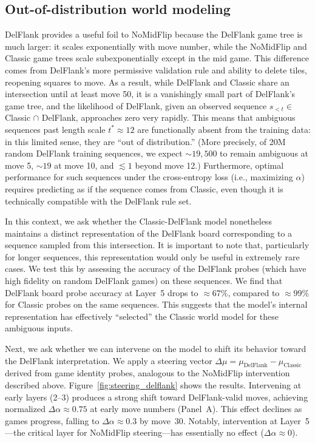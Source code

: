 \documentclass{article}
\theoremstyle{plain}
\theoremstyle{definition}
\theoremstyle{remark}
\begin{document}
\subsection{Out-of-distribution world modeling}

DelFlank provides a useful foil to NoMidFlip because the DelFlank game tree is much larger: it scales exponentially with move number, while the NoMidFlip and Classic game trees scale subexponentially except in the mid game. This difference comes from DelFlank's more permissive validation rule and ability to delete tiles, reopening squares to move. As a result, while DelFlank and Classic share an intersection until at least move 50, it is a vanishingly small part of DelFlank's game tree, and the likelihood of DelFlank, given an observed sequence $s_{<t} \in$ Classic $\cap$ DelFlank, approaches zero very rapidly. This means that ambiguous sequences past length scale $t^* \approx 12$ are functionally absent from the training data: in this limited sense, they are ``out of distribution.'' (More precisely, of 20M random DelFlank training sequences, we expect $\sim 19,500$ to remain ambiguous at move 5, $\sim 19$ at move 10, and $\lesssim 1$ beyond move 12.) Furthermore, optimal performance for such sequences under the cross-entropy loss (i.e., maximizing $\alpha$) requires predicting as if the sequence comes from Classic, even though it is technically compatible with the DelFlank rule set.

In this context, we ask whether the Classic-DelFlank model nonetheless maintains a distinct representation of the DelFlank board corresponding to a sequence sampled from this intersection. It is important to note that, particularly for longer sequences, this representation would only be useful in extremely rare cases. We test this by assessing the accuracy of the DelFlank probes (which have high fidelity on random DelFlank games) on these sequences. We find that DelFlank board probe accuracy at Layer~5 drops to $\approx67\%$, compared to $\approx99\%$ for Classic probes on the same sequences. This suggests that the model's internal representation has effectively ``selected'' the Classic world model for these ambiguous inputs.

Next, we ask whether we can intervene on the model to shift its behavior toward the DelFlank interpretation. We apply a steering vector $\Delta\mu = \mu_{\text{DelFlank}} - \mu_{\text{Classic}}$ derived from game identity probes, analogous to the NoMidFlip intervention described above. Figure~\ref{fig:steering_delflank} shows the results. Intervening at early layers (2--3) produces a strong shift toward DelFlank-valid moves, achieving normalized $\Delta\alpha \approx 0.75$ at early move numbers (Panel~A). This effect declines as games progress, falling to $\Delta\alpha \approx 0.3$ by move~30. Notably, intervention at Layer~5---the critical layer for NoMidFlip steering---has essentially no effect ($\Delta\alpha \approx 0$).
\end{document}
